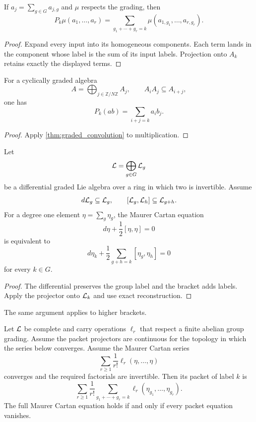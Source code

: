 \begin{theorem}\label{thm:graded_convolution}
If $a_j=\sum_{g\in G}a_{j,g}$ and $\mu$ respects the grading, then
\[
P_k\mu(a_1,\ldots,a_r)
=
\sum_{g_1+\cdots+g_r=k}
\mu(a_{1,g_1},\ldots,a_{r,g_r}).
\]
\end{theorem}

\begin{proof}
Expand every input into its homogeneous components.  Each term lands in the component whose label is the sum of its input labels.  Projection onto $A_k$ retains exactly the displayed terms.
\end{proof}

\begin{corollary}\label{cor:cyclic_product}
For a cyclically graded algebra
\[
A=\bigoplus_{j\in\mathbb Z/N\mathbb Z}A_j,
\qquad
A_iA_j\subseteq A_{i+j},
\]
one has
\[
P_k(ab)=
\sum_{i+j=k}a_ib_j.
\]
\end{corollary}

\begin{proof}
Apply \cref{thm:graded_convolution} to multiplication.
\end{proof}

\begin{theorem}\label{thm:packet_mc}
Let
\[
\mathcal L=\bigoplus_{g\in G}\mathcal L_g
\]
be a differential graded Lie algebra over a ring in which two is invertible.  Assume
\[
d\mathcal L_g\subseteq\mathcal L_g,
\qquad
[\mathcal L_g,\mathcal L_h]\subseteq\mathcal L_{g+h}.
\]
For a degree one element $\eta=\sum_g\eta_g$, the Maurer Cartan equation
\[
d\eta+\frac12[\eta,\eta]=0
\]
is equivalent to
\[
d\eta_k
+
\frac12
\sum_{g+h=k}[\eta_g,\eta_h]
=0
\]
for every $k\in G$.
\end{theorem}

\begin{proof}
The differential preserves the group label and the bracket adds labels.  Apply the projector onto $\mathcal L_k$ and use exact reconstruction.
\end{proof}

The same argument applies to higher brackets.

\begin{proposition}\label{prop:packet_l_infinity}
Let $\mathcal L$ be complete and carry operations $\ell_r$ that respect a finite abelian group grading. Assume the packet projectors are continuous for the topology in which the series below converges.  Assume the Maurer Cartan series
\[
\sum_{r\ge1}\frac1{r!}\ell_r(\eta,\ldots,\eta)
\]
converges and the required factorials are invertible.  Then its packet of label $k$ is
\[
\sum_{r\ge1}\frac1{r!}
\sum_{g_1+\cdots+g_r=k}
\ell_r(\eta_{g_1},\ldots,\eta_{g_r}).
\]
The full Maurer Cartan equation holds if and only if every packet equation vanishes.
\end{proposition}

